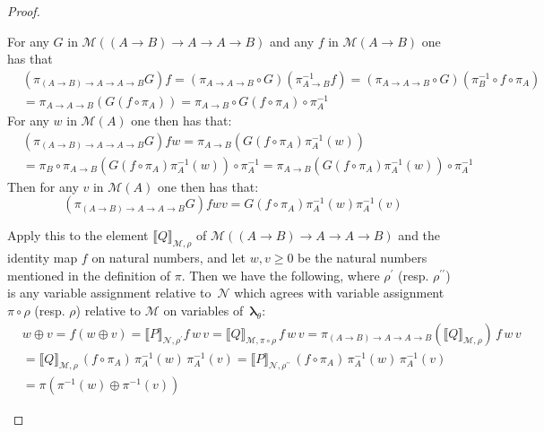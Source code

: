 \documentclass{lmcs} %
\newcommand{\param}{\theta}
\newcommand{\db}[1]{\llbracket#1\rrbracket}
\newcommand{\mltup}{\boldsymbol\lambda_{\param}}
\begin{document}
\begin{proof}
\begin{proofdetail}
For any $G$ in $\mathcal{M}((A\rightarrow B)\rightarrow A\rightarrow A\rightarrow B)$ and any $f$ in $\mathcal{M}(A\rightarrow B)$ one has that
\begin{align*}
& (\pi_{(A\rightarrow B)\rightarrow A\rightarrow A\rightarrow B} G) f  = (\pi_{A\rightarrow A\rightarrow B} \circ G)(\pi^{-1}_{A\rightarrow B} f) = (\pi_{A\rightarrow A\rightarrow B} \circ G)(\pi^{-1}_B \circ f \circ \pi_A) \\
& = \pi_{A\rightarrow A\rightarrow B}(G(f\circ \pi_A)) = \pi_{A\rightarrow B} \circ G(f\circ \pi_A) \circ \pi_A^{-1}
\end{align*}
For any $w$ in $\mathcal{M}(A)$ one then has that:
\begin{align*}
&(\pi_{(A\rightarrow B)\rightarrow A\rightarrow A\rightarrow B} G) f w = \pi_{A\rightarrow B}( G(f\circ \pi_A) \pi_A^{-1}(w)) \\
&=\pi_B \circ \pi_{A\rightarrow B}( G(f\circ \pi_A) \pi_A^{-1}(w)) \circ \pi_A^{-1} = \pi_{A\rightarrow B}( G(f\circ \pi_A) \pi_A^{-1}(w)) \circ \pi_A^{-1}
\end{align*}
Then for any $v$ in $\mathcal{M}(A)$ one then has that:
\begin{equation*}
(\pi_{(A\rightarrow B)\rightarrow A\rightarrow A\rightarrow B} G) f w v = G (f\circ \pi_A) \pi_A^{-1}(w) \pi_A^{-1}(v)
\end{equation*}

Apply this to the element $\db{Q}_{\mathcal{M},\rho}$ of $\mathcal{M}((A\rightarrow B)\rightarrow A\rightarrow A\rightarrow B)$ and the identity map $f$ on natural numbers, and let $w,v\geq 0$ be the natural numbers mentioned in the definition of $\pi$. Then we have the following, where $\rho^{\prime}$ (resp. $\rho^{\prime\prime}$) is any variable assignment relative to~$\mathcal{N}$ which agrees with variable assignment $\pi\circ \rho$ (resp. $\rho$) relative to $\mathcal{M}$ on variables of~$\mltup$:
\begin{align*}
& w\oplus v = f(w\oplus v)=\db{P}_{\mathcal{N},\rho^{\prime}} f\,w\,v = \db{Q}_{\mathcal{M},\pi\circ \rho}\, f\,w\,v = \pi_{(A\rightarrow B)\rightarrow A\rightarrow A\rightarrow B} (\db{Q}_{\mathcal{M}, \rho}) \, f\,w\,v 
\\ & =  \db{Q}_{\mathcal{M}, \rho} \,(f\circ \pi_A)\, \pi_A^{-1}(w)\, \pi_A^{-1}(v) = \db{P}_{\mathcal{N}, \rho^{\prime\prime}}\, (f\circ \pi_A)\, \pi_A^{-1}(w)\, \pi_A^{-1}(v) \\
& = \pi(\pi^{-1}(w)\oplus \pi^{-1}(v))
\end{align*}


\end{proofdetail}
\end{proof}
\end{document}
